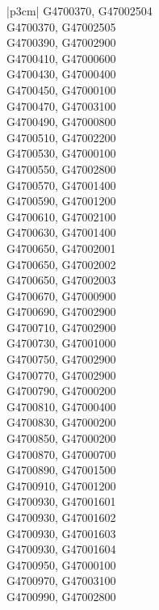 \begin{customLongTable}{ |p{3cm}| }
G4700370, G47002504 \\ \hline
G4700370, G47002505 \\ \hline
G4700390, G47002900 \\ \hline
G4700410, G47000600 \\ \hline
G4700430, G47000400 \\ \hline
G4700450, G47000100 \\ \hline
G4700470, G47003100 \\ \hline
G4700490, G47000800 \\ \hline
G4700510, G47002200 \\ \hline
G4700530, G47000100 \\ \hline
G4700550, G47002800 \\ \hline
G4700570, G47001400 \\ \hline
G4700590, G47001200 \\ \hline
G4700610, G47002100 \\ \hline
G4700630, G47001400 \\ \hline
G4700650, G47002001 \\ \hline
G4700650, G47002002 \\ \hline
G4700650, G47002003 \\ \hline
G4700670, G47000900 \\ \hline
G4700690, G47002900 \\ \hline
G4700710, G47002900 \\ \hline
G4700730, G47001000 \\ \hline
G4700750, G47002900 \\ \hline
G4700770, G47002900 \\ \hline
G4700790, G47000200 \\ \hline
G4700810, G47000400 \\ \hline
G4700830, G47000200 \\ \hline
G4700850, G47000200 \\ \hline
G4700870, G47000700 \\ \hline
G4700890, G47001500 \\ \hline
G4700910, G47001200 \\ \hline
G4700930, G47001601 \\ \hline
G4700930, G47001602 \\ \hline
G4700930, G47001603 \\ \hline
G4700930, G47001604 \\ \hline
G4700950, G47000100 \\ \hline
G4700970, G47003100 \\ \hline
G4700990, G47002800 \\ \hline

\end{customLongTable}
